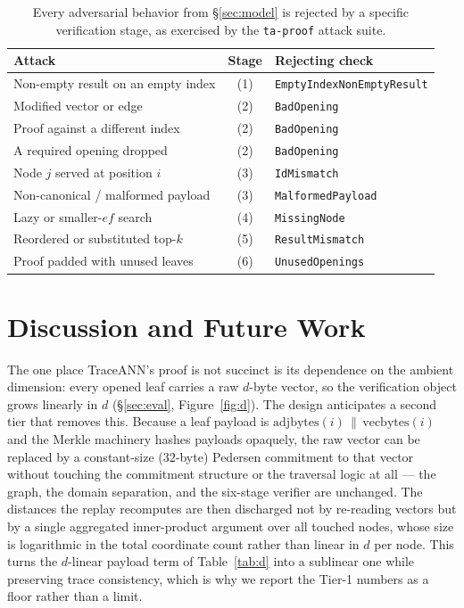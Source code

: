 \documentclass[11pt]{article}
\newcommand{\sys}{TraceANN}
\begin{document}
\begin{table}[t]\centering\footnotesize
\caption{Every adversarial behavior from \S\ref{sec:model} is rejected
by a specific verification stage, as exercised by the \texttt{ta-proof}
attack suite.}\label{tab:attacks}
\begin{tabular}{@{}lcl@{}}
\toprule
Attack & Stage & Rejecting check \\
\midrule
Non-empty result on an empty index & (1) & \texttt{EmptyIndexNonEmptyResult} \\
Modified vector or edge            & (2) & \texttt{BadOpening} \\
Proof against a different index     & (2) & \texttt{BadOpening} \\
A required opening dropped          & (2) & \texttt{BadOpening} \\
Node $j$ served at position $i$     & (3) & \texttt{IdMismatch} \\
Non-canonical / malformed payload   & (3) & \texttt{MalformedPayload} \\
Lazy or smaller-$\mathit{ef}$ search & (4) & \texttt{MissingNode} \\
Reordered or substituted top-$k$    & (5) & \texttt{ResultMismatch} \\
Proof padded with unused leaves     & (6) & \texttt{UnusedOpenings} \\
\bottomrule
\end{tabular}
\end{table}

\section{Discussion and Future Work}\label{sec:discussion}

The one place \sys{}'s proof is not succinct is its dependence on the
ambient dimension: every opened leaf carries a raw $d$-byte vector, so
the verification object grows linearly in $d$ (\S\ref{sec:eval},
Figure~\ref{fig:d}). The design anticipates a second tier that removes
this. Because a leaf payload is
$\mathrm{adjbytes}(i)\,\|\,\mathrm{vecbytes}(i)$ and the Merkle
machinery hashes payloads opaquely, the raw vector can be replaced by a
constant-size ($32$-byte) Pedersen commitment to that vector without
touching the commitment structure or the traversal logic at all --- the
graph, the domain separation, and the six-stage verifier are unchanged.
The distances the replay recomputes are then discharged not by
re-reading vectors but by a single aggregated inner-product argument
\cite{bunz2018bulletproofs} over all touched nodes, whose size is
logarithmic in the total coordinate count rather than linear in $d$ per
node. This turns the $d$-linear payload term of Table~\ref{tab:d} into a
sublinear one while preserving trace consistency, which is why we report
the Tier-1 numbers as a floor rather than a limit.
\end{document}
